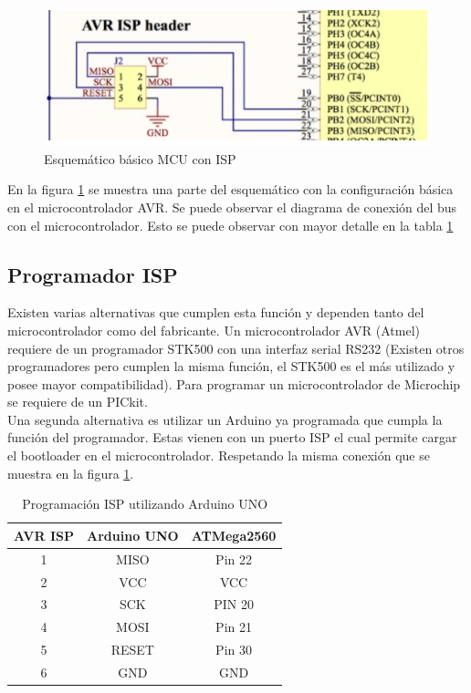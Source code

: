 \begin{figure}[H]
\centering
\includegraphics[scale=0.6]{figuras/firmware/eagleisp.png}
\caption{Esquemático básico MCU con ISP}
\label{eagle11}
\end{figure}

En la figura \ref{eagle11} se muestra una parte del esquemático con la configuración básica en el microcontrolador AVR.
Se puede observar el diagrama de conexión del bus con el microcontrolador. Esto se puede observar con mayor detalle en la tabla \ref{tablaisp}\\

\subsection{Programador ISP}
 Existen varias alternativas que cumplen esta función y dependen tanto del microcontrolador como del fabricante. Un microcontrolador AVR (Atmel) requiere de un programador STK500 con una interfaz serial RS232 (Existen otros programadores pero cumplen la misma función, el STK500 es el más utilizado y posee mayor compatibilidad). Para programar un microcontrolador de Microchip se requiere de un PICkit.\\ 
Una segunda alternativa es utilizar un Arduino ya programada que cumpla la función del programador. Estas vienen con un puerto ISP el cual permite cargar el bootloader en el microcontrolador. Respetando la misma conexión que se muestra en la figura \ref{eagle11}.\\

\begin{table}[H]
\centering
\begin{tabular}{| c | c | c |}
\hline
\multicolumn{1}{|c|}{\textbf{AVR ISP}}&
\multicolumn{1}{c|}{\textbf{Arduino UNO}}&
\multicolumn{1}{|c|}{\textbf{ATMega2560}}\\ \hline
1 & MISO  & Pin 22 \\ \hline
2 & VCC   & VCC    \\ \hline
3 & SCK   & PIN 20 \\ \hline
4 & MOSI  & Pin 21 \\ \hline
5 & RESET & Pin 30 \\ \hline
6 & GND   & GND    \\ \hline
\end{tabular}
\caption{Programación ISP utilizando Arduino UNO}
\label{tablaisp}
\end{table}

